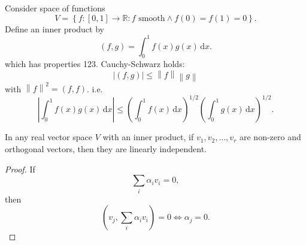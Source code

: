 \documentclass[10pt]{article}
\def\le{\leqslant}
\begin{document}
    \begin{example}
        Consider space of functions 
        $$ V=\left\{ f:[0,1]\to \mathbb{R} : f \text{ smooth}\land f(0)=f(1)=0\right\} .$$
        Define an inner product by 
        \[
            (f,g)=\int_{0}^{1} f(x)g(x) \,\mathrm{d}x
        .\]
        which has properties 123. Cauchy-Schwarz holds:
        \[
            |(f,g)|\le \left\| f \right\| \left\| g \right\| 
        \]
        with $ \left\| f \right\|^2 =(f,f) $. i.e.
        \[
            \left| \int_{0}^{1} f(x)g(x) \,\mathrm{d}x \right| \le \left( \int_{0}^{1} f(x) \,\mathrm{d}x \right)^{1/2}\left( \int_{0}^{1} g(x) \,\mathrm{d}x \right)^{1/2}
        .\]
    \end{example}
    \begin{lemma}\label{lma:innerprod}
        In any real vector space $V$ with an inner product, if $v_1,v_2,\dots,v_r$ are non-zero and orthogonal vectors, then they are linearly independent.
    \end{lemma}
    \begin{proof}
        If 
        \[
            \sum_{i}\alpha_i v_i=0
        ,\]
        then
        \[
            (v_j,\sum_{i}\alpha_i v_i)=0 \Longleftrightarrow \alpha_j=0
        .\]
    \end{proof}
\end{document}
